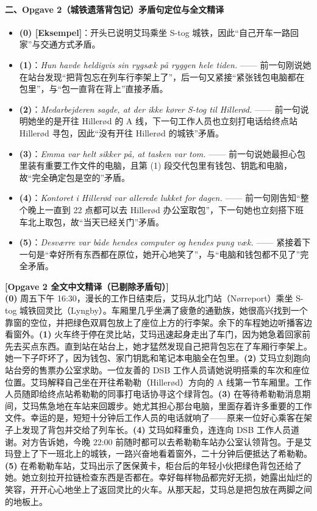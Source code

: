 \paragraph*{二、Opgave 2（城铁遗落背包记）矛盾句定位与全文精译}
\begin{itemize}
  \item \textbf{(0) [Eksempel]}：开头已说明艾玛乘坐 S-tog 城铁，因此“自己开车一路回家”与交通方式矛盾。
  \item \textbf{(1)}：\textit{Hun havde heldigvis sin rygsæk på ryggen hele tiden.} —— 前一句刚说她在站台发现“把背包忘在列车行李架上了”，后一句又紧接“紧张钱包电脑都在包里”，与“包一直背在背上”直接矛盾。
  \item \textbf{(2)}：\textit{Medarbejderen sagde, at der ikke kører S-tog til Hillerød.} —— 前一句说明她坐的是开往 Hillerød 的 A 线，下一句工作人员也立刻打电话给终点站 Hillerød 寻包，因此“没有开往 Hillerød 的城铁”矛盾。
  \item \textbf{(3)}：\textit{Emma var helt sikker på, at tasken var tom.} —— 前一句说她最担心包里装有重要工作文件的电脑，且第 (1) 段交代包里有钱包、钥匙和电脑，故“完全确定包是空的”矛盾。
  \item \textbf{(4)}：\textit{Kontoret i Hillerød var allerede lukket for dagen.} —— 前一句刚告知“整个晚上一直到 22 点都可以去 Hillerød 办公室取包”，下一句她也立刻搭下班车北上取包，故“当天已经关门”矛盾。
  \item \textbf{(5)}：\textit{Desværre var både hendes computer og hendes pung væk.} —— 紧接着下一句是“幸好所有东西都在原位，她开心地笑了”，与“电脑和钱包都不见了”完全矛盾。
\end{itemize}

\begin{transbox}
\small
\textbf{\color{NCDTeal}[Opgave 2 全文中文精译（已剔除矛盾句）]}\\
\textbf{(0)} 周五下午 16:30，漫长的工作日结束后，艾玛从北门站（Nørreport）乘坐 S-tog 城铁回灵比（Lyngby）。车厢里几乎坐满了疲惫的通勤族，她很高兴找到一个靠窗的空位，并把绿色双肩包放上了座位上方的行李架。余下的车程她边听播客边看窗外。\textbf{(1)} 火车终于停在灵比站，艾玛迅速起身走出了车门，因为她急着回家前先去买点东西。直到站在站台上，她才猛然发现自己把背包忘在了车厢行李架上。她一下子吓坏了，因为钱包、家门钥匙和笔记本电脑全在包里。\textbf{(2)} 艾玛立刻跑向站台旁的售票办公室求助。一位友善的 DSB 工作人员请她说明搭乘的车次和座位位置。艾玛解释自己坐在开往希勒勒（Hillerød）方向的 A 线第一节车厢里。工作人员随即给终点站希勒勒的同事打电话协寻这个绿背包。\textbf{(3)} 在等待希勒勒消息期间，艾玛焦急地在车站来回踱步。她尤其担心那台电脑，里面存着许多重要的工作文件。幸运的是，短短十分钟后工作人员的电话就响了——原来一位好心乘客在架子上发现了背包并交给了列车长。\textbf{(4)} 艾玛如释重负，连连向 DSB 工作人员道谢。对方告诉她，今晚 22:00 前随时都可以去希勒勒车站办公室认领背包。于是艾玛登上了下一班北上的城铁，一路兴奋地看着窗外，二十分钟后便抵达了希勒勒。\textbf{(5)} 在希勒勒车站，艾玛出示了医保黄卡，柜台后的年轻小伙把绿色背包还给了她。她立刻拉开拉链检查东西是否都在。幸好每样物品都完好无损，她露出灿烂的笑容，开开心心地坐上了返回灵比的火车。从那天起，艾玛总是把包放在两脚之间的地板上。
\end{transbox}

